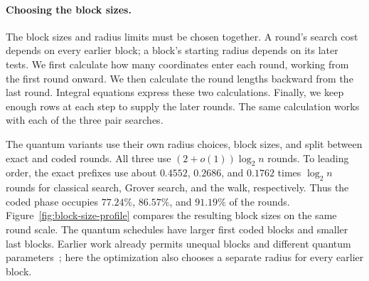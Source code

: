 \documentclass[runningheads,envcountsame,envcountsect,orivec]{llncs}
\begin{document}
\paragraph{Choosing the block sizes.}
The block sizes and radius limits must be chosen together.
A round's search cost depends on every earlier block; a block's
starting radius depends on its later tests. We first calculate
how many coordinates enter each round, working from the first
round onward. We then calculate the round lengths backward
from the last round. Integral equations express these two
calculations. Finally, we keep enough rows at each step to
supply the later rounds. The same calculation works with
each of the three pair searches.

The quantum variants use their own radius choices, block sizes,
and split between exact and coded rounds. All three use
$(2+o(1))\log_2 n$ rounds. To leading order, the exact prefixes
use about $0.4552$, $0.2686$, and $0.1762$ times $\log_2 n$ rounds
for classical search, Grover search, and the walk, respectively. Thus the coded phase occupies $77.24\%$, $86.57\%$,
and $91.19\%$ of the rounds. Figure~\ref{fig:block-size-profile}
compares the resulting block sizes on the same round scale.
The quantum schedules have larger first coded blocks and smaller
last blocks. Earlier work already permits unequal blocks and different quantum
parameters~\cite[Sections~III--V]{M19}; here the optimization also
chooses a separate radius for every earlier block.
\end{document}
